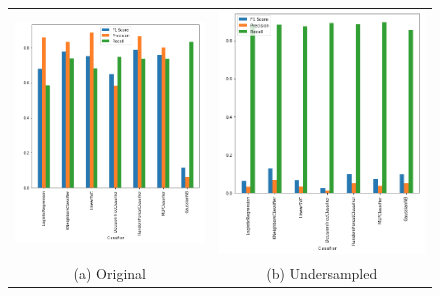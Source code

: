 \documentclass[12pt,a4paper,twoside]{report}
\begin{document}
\begin{figure}[!htbp]
\centering
\begin{tabular}{cc}
  \includegraphics[width=80mm]{baseline-results-original} &   \includegraphics[width=80mm]{baseline-results-under} \\
(a) Original & (b) Undersampled \\[6pt]

\end{tabular}
\end{figure}
\end{document}
